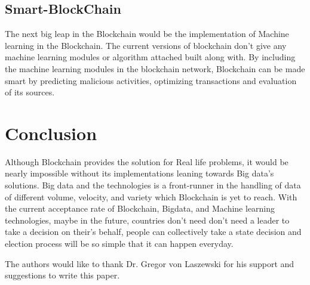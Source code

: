 \documentclass[sigconf]{acmart}
\begin{document}
\subsection{Smart-BlockChain}
The next big leap in the Blockchain would be the implementation of Machine learning in the Blockchain. The current versions of blockchain don't give any machine learning modules or algorithm attached built along with. By including the machine learning modules in the blockchain network, Blockchain can be made smart by predicting malicious activities, optimizing transactions and evaluation of its sources.


\section{Conclusion}
Although Blockchain provides the solution for  Real life problems, it would be nearly impossible without its implementations leaning towards Big data's solutions. Big data and the technologies is a front-runner in the handling of data of different volume, velocity, and variety which Blockchain is yet to reach. With the current acceptance rate of Blockchain, Bigdata, and Machine learning technologies, maybe in the future, countries don't need don't need a leader to take a decision on their's behalf, people can collectively take a state decision and election process will be so simple that it can happen everyday.



\begin{acks}

  The authors would like to thank Dr. Gregor von Laszewski for his
  support and suggestions to write this paper.

\end{acks}


 
\end{document}
